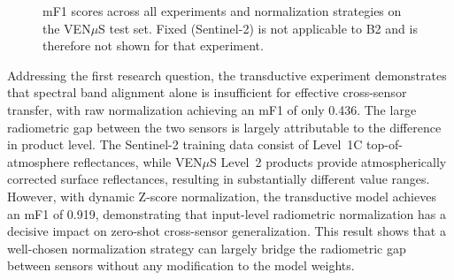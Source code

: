 \begin{figure}[H]
\centering
{}
\caption[mF1 scores across all experiments and normalization strategies.]{mF1 scores across all experiments and normalization strategies on the VEN$\mu$S test set. Fixed (Sentinel-2) is not applicable to B2 and is therefore not shown for that experiment.}
\label{fig:comparative_bar}
\end{figure}

Addressing the first research question, the transductive experiment demonstrates that spectral band alignment alone is insufficient for effective cross-sensor transfer, with raw normalization achieving an mF1 of only 0.436. The large radiometric gap between the two sensors is largely attributable to the difference in product level. The Sentinel-2 training data consist of Level~1C top-of-atmosphere reflectances, while VEN$\mu$S Level~2 products provide atmospherically corrected surface reflectances, resulting in substantially different value ranges. However, with dynamic Z-score normalization, the transductive model achieves an mF1 of 0.919, demonstrating that input-level radiometric normalization has a decisive impact on zero-shot cross-sensor generalization. This result shows that a well-chosen normalization strategy can largely bridge the radiometric gap between sensors without any modification to the model weights.

